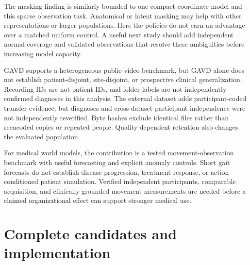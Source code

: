 \documentclass[letterpaper]{article}
\begin{document}
The masking finding is similarly bounded to one compact coordinate model and this sparse observation task. Anatomical or latent masking may help with other representations or larger populations. Here the policies do not earn an advantage over a matched uniform control. A useful next study should add independent normal coverage and validated observations that resolve these ambiguities before increasing model capacity.

GAVD supports a heterogeneous public-video benchmark, but GAVD alone does not establish patient-disjoint, site-disjoint, or prospective clinical generalization. Recording IDs are not patient IDs, and folder labels are not independently confirmed diagnoses in this analysis. The external dataset adds participant-coded transfer evidence, but diagnoses and cross-dataset participant independence were not independently reverified. Byte hashes exclude identical files rather than reencoded copies or repeated people. Quality-dependent retention also changes the evaluated population.

For medical world models, the contribution is a tested movement-observation benchmark with useful forecasting and explicit anomaly controls. Short gait forecasts do not establish disease progression, treatment response, or action-conditioned patient simulation. Verified independent participants, comparable acquisition, and clinically grounded movement measurements are needed before a claimed organizational effect can support stronger medical use.



\clearpage

\appendix

\section{Complete candidates and implementation}
\end{document}
